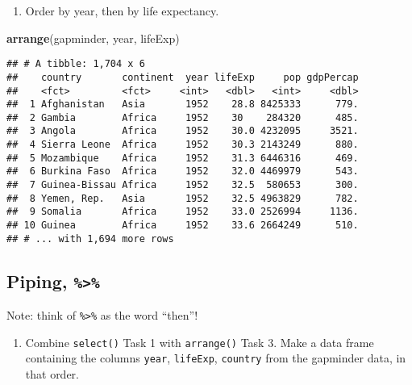\documentclass[]{article}
\newenvironment{Shaded}{\begin{snugshade}}{\end{snugshade}}
\newcommand{\KeywordTok}[1]{\textcolor[rgb]{0.13,0.29,0.53}{\textbf{{#1}}}}
\newcommand{\StringTok}[1]{\textcolor[rgb]{0.31,0.60,0.02}{{#1}}}
\newcommand{\NormalTok}[1]{{#1}}
\providecommand{\tightlist}{%
  \setlength{\itemsep}{0pt}\setlength{\parskip}{0pt}}
\begin{document}
\begin{enumerate}
\def\labelenumi{\arabic{enumi}.}
\setcounter{enumi}{2}
\tightlist
\item
  Order by year, then by life expectancy.
\end{enumerate}

\begin{Shaded}
\begin{Highlighting}[]
\KeywordTok{arrange}\NormalTok{(gapminder, year, lifeExp)}
\end{Highlighting}
\end{Shaded}

\begin{verbatim}
## # A tibble: 1,704 x 6
##    country       continent  year lifeExp     pop gdpPercap
##    <fct>         <fct>     <int>   <dbl>   <int>     <dbl>
##  1 Afghanistan   Asia       1952    28.8 8425333      779.
##  2 Gambia        Africa     1952    30    284320      485.
##  3 Angola        Africa     1952    30.0 4232095     3521.
##  4 Sierra Leone  Africa     1952    30.3 2143249      880.
##  5 Mozambique    Africa     1952    31.3 6446316      469.
##  6 Burkina Faso  Africa     1952    32.0 4469979      543.
##  7 Guinea-Bissau Africa     1952    32.5  580653      300.
##  8 Yemen, Rep.   Asia       1952    32.5 4963829      782.
##  9 Somalia       Africa     1952    33.0 2526994     1136.
## 10 Guinea        Africa     1952    33.6 2664249      510.
## # ... with 1,694 more rows
\end{verbatim}

\subsection{\texorpdfstring{Piping,
\texttt{\%\textgreater{}\%}}{Piping, \%\textgreater{}\%}}\label{piping}

Note: think of \texttt{\%\textgreater{}\%} as the word ``then''!

\begin{enumerate}
\def\labelenumi{\arabic{enumi}.}
\tightlist
\item
  Combine \texttt{select()} Task 1 with \texttt{arrange()} Task 3. Make
  a data frame containing the columns \texttt{year}, \texttt{lifeExp},
  \texttt{country} from the gapminder data, in that order.
\end{enumerate}

\begin{Shaded}
\end{Shaded}
\end{document}

